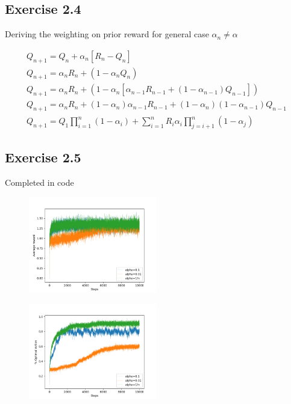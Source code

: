 \subsection{Exercise 2.4}
Deriving the weighting on prior reward for general case $\alpha_n \not= \alpha$

\begin{gather}
  Q_{n+1} = Q_n + \alpha_n[R_n - Q_n] \\
  Q_{n+1} = \alpha_nR_n + (1-\alpha_nQ_n) \\
  Q_{n+1} = \alpha_nR_n + (1-\alpha_n[\alpha_{n-1}R_{n-1} + (1-\alpha_{n-1})Q_{n-1}]) \\
  Q_{n+1} = \alpha_nR_n + (1-\alpha_n)\alpha_{n-1}R_{n-1} + (1-\alpha_n)(1-\alpha_{n-1})Q_{n-1} \\
  Q_{n+1} = Q_1\prod\limits_{i=1}^n(1-\alpha_i) + \sum\limits_{i=1}^nR_i\alpha_i\prod\limits_{j=i+1}^n(1-\alpha_j)
\end{gather}

\subsection{Exercise 2.5}
Completed in code


\begin{figure}[htbp]
  \centering
  \includegraphics[width=0.5\textwidth]{../../code/figures/exercise2_5a.png}
\end{figure}

\begin{figure}[htbp]
  \centering
  \includegraphics[width=0.5\textwidth]{../../code/figures/exercise2_5b.png}
\end{figure}

